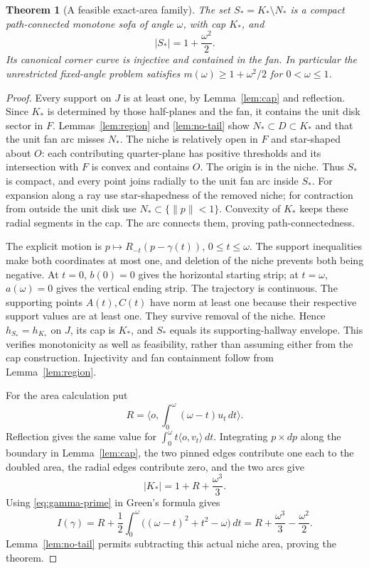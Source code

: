 \documentclass[11pt]{article}
\newtheorem{theorem}{Theorem}[section]
\theoremstyle{remark}\newtheorem{remark}[theorem]{Remark}
\newcommand{\area}[1]{\lvert #1\rvert}
\newcommand{\ip}[2]{\langle #1,#2\rangle}
\begin{document}
\begin{theorem}[A feasible exact-area family]\label{thm:feasible}
The set $S_*=K_*\setminus N_*$ is a compact path-connected monotone sofa of angle $\omega$, with cap $K_*$, and
\[
 \area{S_*}=1+\frac{\omega^2}{2}.
\]
Its canonical corner curve is injective and contained in the fan. In particular the unrestricted fixed-angle problem satisfies $m(\omega)\ge1+\omega^2/2$ for $0<\omega\le1$.
\end{theorem}
\begin{proof}
Every support on $J$ is at least one, by Lemma~\ref{lem:cap} and reflection. Since $K_*$ is determined by those half-planes and the fan, it contains the unit disk sector in $F$. Lemmas~\ref{lem:region} and \ref{lem:no-tail} show $N_*\subset D\subset K_*$ and that the unit fan arc misses $N_*$. The niche is relatively open in $F$ and star-shaped about $O$: each contributing quarter-plane has positive thresholds and its intersection with $F$ is convex and contains $O$. The origin is in the niche. Thus $S_*$ is compact, and every point joins radially to the unit fan arc inside $S_*$. For expansion along a ray use star-shapedness of the removed niche; for contraction from outside the unit disk use $N_*\subset\{\lVert p\rVert<1\}$. Convexity of $K_*$ keeps these radial segments in the cap. The arc connects them, proving path-connectedness.

The explicit motion is $p\mapsto R_{-t}(p-\gamma(t))$, $0\le t\le\omega$. The support inequalities make both coordinates at most one, and deletion of the niche prevents both being negative. At $t=0$, $b(0)=0$ gives the horizontal starting strip; at $t=\omega$, $a(\omega)=0$ gives the vertical ending strip. The trajectory is continuous. The supporting points $A(t),C(t)$ have norm at least one because their respective support values are at least one. They survive removal of the niche. Hence $h_{S_*}=h_{K_*}$ on $J$, its cap is $K_*$, and $S_*$ equals its supporting-hallway envelope. This verifies monotonicity as well as feasibility, rather than assuming either from the cap construction. Injectivity and fan containment follow from Lemma~\ref{lem:region}.

For the area calculation put
\[
 R=\ip o{\int_0^\omega(\omega-t)u_t\,dt}.
\]
Reflection gives the same value for $\int_0^\omega t\ip o{v_t}\,dt$. Integrating $p\times dp$ along the boundary in Lemma~\ref{lem:cap}, the two pinned edges contribute one each to the doubled area, the radial edges contribute zero, and the two arcs give
\[
 \area{K_*}=1+R+\frac{\omega^3}{3}.
\]
Using \eqref{eq:gamma-prime} in Green's formula gives
\[
 I(\gamma)=R+\frac12\int_0^\omega\bigl((\omega-t)^2+t^2-\omega\bigr)\,dt
 =R+\frac{\omega^3}{3}-\frac{\omega^2}{2}.
\]
Lemma~\ref{lem:no-tail} permits subtracting this actual niche area, proving the theorem.
\end{proof}
\end{document}
